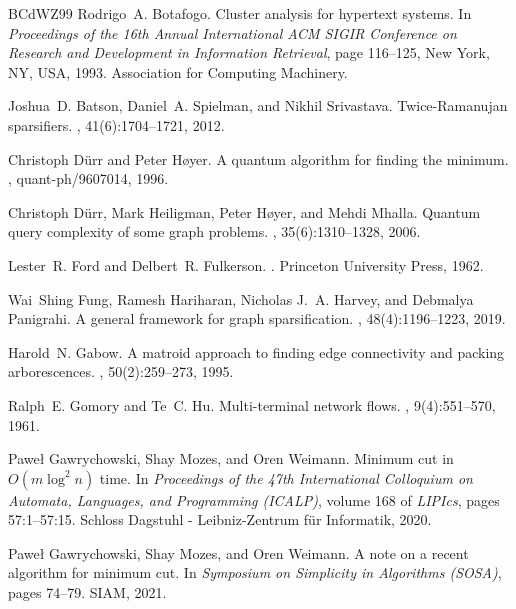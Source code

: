 \begin{thebibliography}{BCdWZ99}
Rodrigo~A. Botafogo.
\newblock Cluster analysis for hypertext systems.
\newblock In {\em Proceedings of the 16th Annual International ACM SIGIR
  Conference on Research and Development in Information Retrieval}, page
  116–125, New York, NY, USA, 1993. Association for Computing Machinery.

Joshua~D. Batson, Daniel~A. Spielman, and Nikhil Srivastava.
\newblock Twice-{R}amanujan sparsifiers.
, 41(6):1704--1721, 2012.

Christoph D{\"{u}}rr and Peter H{\o}yer.
\newblock A quantum algorithm for finding the minimum.
, quant-ph/9607014, 1996.

Christoph D{\"{u}}rr, Mark Heiligman, Peter H{\o}yer, and Mehdi Mhalla.
\newblock Quantum query complexity of some graph problems.
, 35(6):1310--1328, 2006.

Lester~R. Ford and Delbert~R. Fulkerson.
.
\newblock Princeton University Press, 1962.

Wai~Shing Fung, Ramesh Hariharan, Nicholas J.~A. Harvey, and Debmalya
  Panigrahi.
\newblock A general framework for graph sparsification.
, 48(4):1196--1223, 2019.

Harold~N. Gabow.
\newblock A matroid approach to finding edge connectivity and packing
  arborescences.
, 50(2):259--273, 1995.

Ralph~E. Gomory and Te~C. Hu.
\newblock Multi-terminal network flows.
,
  9(4):551--570, 1961.

Pawe{\l} Gawrychowski, Shay Mozes, and Oren Weimann.
\newblock Minimum cut in ${O}(m \log^2 n)$ time.
\newblock In {\em Proceedings of the 47th International Colloquium on Automata,
  Languages, and Programming (ICALP)}, volume 168 of {\em LIPIcs}, pages
  57:1--57:15. Schloss Dagstuhl - Leibniz-Zentrum f{\"{u}}r Informatik, 2020.
 
Pawe{\l} Gawrychowski, Shay Mozes, and Oren Weimann.
\newblock A note on a recent algorithm for minimum cut.
\newblock In {\em Symposium on Simplicity in Algorithms (SOSA)}, pages 74--79.
  SIAM, 2021.


\end{thebibliography}
